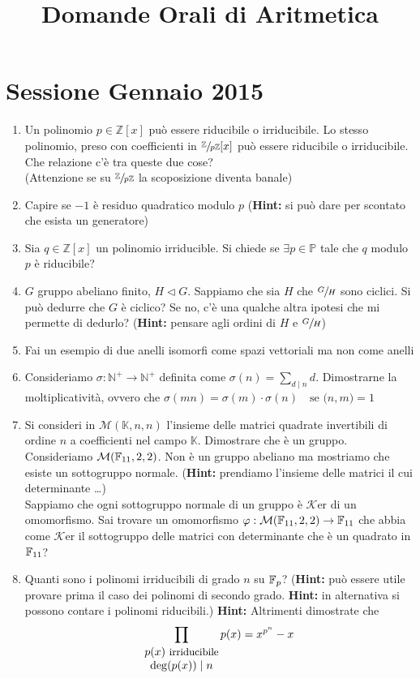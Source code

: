 \documentclass[a4paper,NoNotes]{stdmdoc}
\newcommand{\su}[2]{\sfrac{#1}{#2}}
\newcommand{\PP}{\mathbb{P}}
\newcommand{\NN}{\mathbb{N}}
\newcommand{\KK}{\mathbb{K}}
\newcommand{\Nplus}{\NN^{+}}
\newcommand{\Mtr}[3]{\mathcal{M}(#1, #2, #3)}
\newcommand{\Zx}{\mathbb{Z}[x]}
\newcommand{\Zp}{\su{\mathbb{Z}}{p\mathbb{Z}}}
\newcommand{\Zpx}{\Zp [x]}
\newcommand{\Hint}{{\bf Hint: }}
\newcommand{\Ker}{\mathcal{K}\mbox{er} }
\newcommand{\MCD}[2]{\mathcal{(} #1 \mathcal{,} #2 \mathcal{)}}
\begin{document}
\title{Domande Orali di Aritmetica}
\autodate

\section*{Sessione Gennaio 2015}
	\begin{enumerate}
		\item Un polinomio $p \in \Zx$ pu\`o essere riducibile o irriducibile. Lo stesso polinomio, preso con coefficienti in $\Zpx$ pu\`o essere riducibile o irriducibile. Che relazione c'\`e tra queste due cose? \\ (Attenzione se su $\Zp$ la scoposizione diventa banale)
		\item Capire se $-1$ \`e residuo quadratico modulo $p$ (\Hint si pu\`o dare per scontato che esista un generatore)
		\item Sia $q \in \Zx$ un polinomio irriducible. Si chiede se $\exists p \in \PP$ tale che $q$ modulo $p$ \`e riducibile?
		\item $G$ gruppo abeliano finito, $H \lhd G$. Sappiamo che sia $H$ che $\su{G}{H}$ sono ciclici. Si pu\`o dedurre che $G$ \`e ciclico? Se no, c'\`e una qualche altra ipotesi che mi permette di dedurlo? (\Hint pensare agli ordini di $H$ e $\su{G}{H}$)
		\item Fai un esempio di due anelli isomorfi come spazi vettoriali ma non come anelli
		\item Consideriamo $\sigma : \Nplus \rightarrow \Nplus$ definita come $\sigma(n) = \sum_{d \mid n} d$. Dimostrarne la moltiplicativit\`a, ovvero che $\sigma(mn) = \sigma(m)\cdot\sigma(n) \quad \mbox{se } \MCD{n}{m}=1$
		\item Si consideri in $\Mtr{\KK}{n}{n}$ l'insieme delle matrici quadrate invertibili di ordine $n$ a coefficienti nel campo $\KK$. Dimostrare che è un gruppo. \\ Consideriamo $\Mtr{\FF{11}}{2}{2}$. Non \`e un gruppo abeliano ma mostriamo che esiste un sottogruppo normale. (\Hint prendiamo l'insieme delle matrici il cui determinante \ldots) \\ Sappiamo che ogni sottogruppo normale di un gruppo \`e $\Ker$ di un omomorfismo. Sai trovare un omomorfismo $\varphi : \Mtr{\FF{11}}{2}{2}  \rightarrow \FF{11}$ che abbia come $\Ker$ il sottogruppo delle matrici con determinante che è un quadrato in $\FF{11}$?
		\item Quanti sono i polinomi irriducibili di grado $n$ su $\FF{p}$? (\Hint pu\`o essere utile provare prima il caso dei polinomi di secondo grado. \Hint in alternativa si possono contare i polinomi riducibili.) \Hint Altrimenti dimostrate che $$\prod_{\begin{matrix} p(x) \mbox{ \small irriducibile} \\ \deg(p(x)) \mid n \end{matrix}} p(x) = x^{p^n}-x$$

\end{enumerate}
\end{document}
